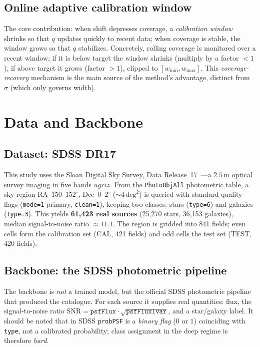 \documentclass[pdflatex,sn-mathphys-num]{sn-jnl}%
\begin{document}
\subsection{Online adaptive calibration window}
The core contribution: when shift depresses coverage, a \emph{calibration window} shrinks so that $q$
updates quickly to recent data; when coverage is stable, the window grows so that $q$ stabilizes.
Concretely, rolling coverage is monitored over a recent window; if it is below target the window shrinks
(multiply by a factor $<1$), if above target it grows (factor $>1$), clipped to $[w_{\min},w_{\max}]$.
This \emph{coverage-recovery} mechanism is the main source of the method's advantage, distinct from
$\sigma$ (which only governs width).

\section{Data and Backbone}\label{sec:data}

\subsection{Dataset: SDSS DR17}
This study uses the Sloan Digital Sky Survey, Data Release~17~\cite{sdssdr17}---a $2.5$\,m optical survey
imaging in five bands $ugriz$. From the \texttt{PhotoObjAll} photometric table, a sky region
RA~$150$--$152^\circ$, Dec~$0$--$2^\circ$ ($\sim 4\,\mathrm{deg}^2$) is queried with standard quality flags
(\texttt{mode=1} primary, \texttt{clean=1}), keeping two classes: stars (\texttt{type=6}) and galaxies
(\texttt{type=3}). This yields \textbf{61{,}423 real sources} (25{,}270 stars, 36{,}153 galaxies), median
signal-to-noise ratio $\approx 11.1$. The region is gridded into 841 fields; even cells form the
calibration set (CAL, 421 fields) and odd cells the test set (TEST, 420 fields).

\subsection{Backbone: the SDSS photometric pipeline}
The backbone is \emph{not} a trained model, but the official SDSS photometric pipeline that produced the
catalogue. For each source it supplies real quantities: flux, the signal-to-noise ratio
$\mathrm{SNR}=\texttt{psfFlux}\cdot\sqrt{\texttt{psfFluxIvar}}$, and a star/galaxy label. It should be noted
that in SDSS \texttt{probPSF} is a \emph{binary flag} ($0$ or $1$) coinciding with \texttt{type}, not a
calibrated probability; class assignment in the deep regime is therefore \emph{hard}.
\end{document}
